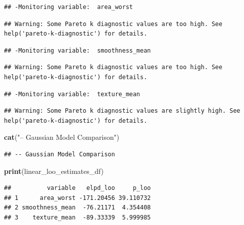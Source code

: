 \documentclass[
]{article}
\newenvironment{Shaded}{\begin{snugshade}}{\end{snugshade}}
\newcommand{\KeywordTok}[1]{\textcolor[rgb]{0.13,0.29,0.53}{\textbf{#1}}}
\newcommand{\NormalTok}[1]{#1}
\newcommand{\StringTok}[1]{\textcolor[rgb]{0.31,0.60,0.02}{#1}}
\begin{document}
\begin{verbatim}
## -Monitoring variable:  area_worst
\end{verbatim}

\begin{verbatim}
## Warning: Some Pareto k diagnostic values are too high. See help('pareto-k-diagnostic') for details.
\end{verbatim}

\begin{verbatim}
## -Monitoring variable:  smoothness_mean
\end{verbatim}

\begin{verbatim}
## Warning: Some Pareto k diagnostic values are too high. See help('pareto-k-diagnostic') for details.
\end{verbatim}

\begin{verbatim}
## -Monitoring variable:  texture_mean
\end{verbatim}

\begin{verbatim}
## Warning: Some Pareto k diagnostic values are slightly high. See help('pareto-k-diagnostic') for details.
\end{verbatim}

\begin{Shaded}
\begin{Highlighting}[]
\KeywordTok{cat}\NormalTok{(}\StringTok{"-- Gaussian Model Comparison"}\NormalTok{)}
\end{Highlighting}
\end{Shaded}

\begin{verbatim}
## -- Gaussian Model Comparison
\end{verbatim}

\begin{Shaded}
\begin{Highlighting}[]
\KeywordTok{print}\NormalTok{(linear_loo_estimates_df)}
\end{Highlighting}
\end{Shaded}

\begin{verbatim}
##          variable   elpd_loo     p_loo
## 1      area_worst -171.20456 39.110732
## 2 smoothness_mean  -76.21171  4.354408
## 3    texture_mean  -89.33339  5.999985
\end{verbatim}
\end{document}

